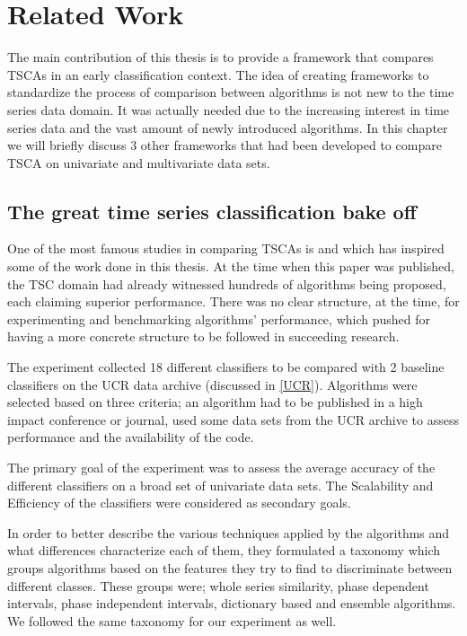 \chapter{Related Work}
\label{ChapterRelatedWork}
The main contribution of this thesis is to provide a framework that compares TSCAs in an early classification context.
The idea of creating frameworks to standardize the process of comparison between algorithms is not new to the time series data domain.
It was actually needed due to the increasing interest in time series data and the vast amount of newly introduced algorithms.
In this chapter we will briefly discuss 3 other frameworks that had been developed to compare TSCA on univariate and multivariate data sets.

\section{The great time series classification bake off}
\label{GreatBakeoffUnivariate}
One of the most famous studies in comparing TSCAs is \cite{bagnall2017great} and which has inspired some of the work done in this thesis.
At the time when this paper was published, the TSC domain had already witnessed hundreds of algorithms being proposed, each claiming superior performance.
There was no clear structure, at the time, for experimenting and benchmarking algorithms' performance, which pushed for having a more concrete structure to be followed in succeeding research.

The experiment collected 18 different classifiers to be compared with 2 baseline classifiers on the UCR data archive (discussed in \ref{UCR}).
Algorithms were selected based on three criteria; an algorithm had to be published in a high impact conference or journal, used some data sets from the UCR archive to assess performance
and the availability of the code.

The primary goal of the experiment was to assess the average accuracy of the different classifiers on a broad set of univariate data sets.
The Scalability and Efficiency of the classifiers were considered as secondary goals.

In order to better describe the various techniques applied by the algorithms and what differences characterize each of them, they formulated a taxonomy which 
groups algorithms based on the features they try to find to discriminate between different classes.
These groups were; whole series similarity, phase dependent intervals, phase independent intervals, dictionary based and ensemble algorithms.
We followed the same taxonomy for our experiment as well.

